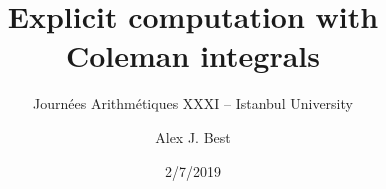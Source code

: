 \DeclareMathOperator{\rank}{rank}
\newcommand{\sheaf}[1]{\operatorname{\mathcal{#1}}}
\DeclareMathOperator{\Jac}{Jac}
\newcommand{\inv}{^{-1}}
\DeclareMathOperator{\norm}{Nm}
\DeclareMathOperator{\ord}{ord}
\DeclareMathOperator{\divisor}{div}
\DeclareMathOperator{\PP}{\mathbf{P}}
\DeclareMathOperator{\Hom}{Hom}
\DeclareMathOperator{\Mat}{Mat}
\DeclareMathOperator{\End}{End}

\newcommand{\lb}{[}
\newcommand{\rb}{]}


\author{Alex J. Best}
\date{2/7/2019}
\title{Explicit computation with Coleman integrals}
\subtitle{Journées Arithmétiques XXXI -- Istanbul University}



\begin{frame}
  \titlepage

\end{frame}


